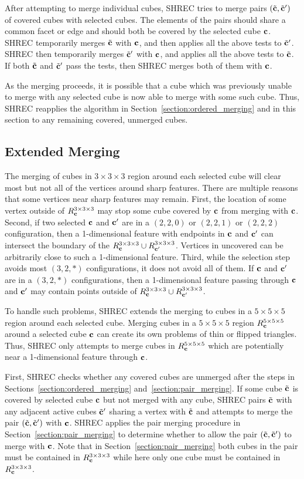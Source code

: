 After attempting to merge individual cubes,
SHREC tries to merge pairs $({\tilde{\mathbf{c}}},{\tilde{\mathbf{c}}}')$ of covered cubes with selected cubes.
The elements of the pairs should share a common facet or edge
and should both be covered by the selected cube $\mathbf{c}$.
SHREC temporarily merges ${\tilde{\mathbf{c}}}$ with $\mathbf{c}$,
and then applies all the above tests to ${\tilde{\mathbf{c}}}'$.
SHREC then temporarily merges ${\tilde{\mathbf{c}}}'$ with $\mathbf{c}$,
and applies all the above tests to ${\tilde{\mathbf{c}}}$.
If both ${\tilde{\mathbf{c}}}$ and ${\tilde{\mathbf{c}}}'$ pass the tests,
then SHREC merges both of them with $\mathbf{c}$.

As the merging proceeds,
it is possible that a cube which was previously unable 
to merge with any selected cube
is now able to merge with some such cube.
Thus, SHREC reapplies the algorithm in Section~\ref{section:ordered_merging}
and in this section to any remaining covered, unmerged cubes.


\subsection{Extended Merging}
\label{section:extended_merging}

The merging of cubes in $3 \times 3 \times 3$ region
around each selected cube will clear most but not all of the vertices 
around sharp features.
There are multiple reasons that some vertices 
near sharp features may remain.
First, the location of some vertex outside of $R^{3 \times 3 \times 3}_{\mathbf{c}}$
may stop some cube covered by $\mathbf{c}$ from merging with $\mathbf{c}$.
Second, if two selected $\mathbf{c}$ and $\mathbf{c}'$ are 
in a $(2,2,0)$ or $(2,2,1)$ or $(2,2,2)$ configuration, 
then a 1-dimensional feature with endpoints in $\mathbf{c}$ and $\mathbf{c}'$ can intersect
the boundary of the $R^{3 \times 3 \times 3}_{\mathbf{c}} \cup R^{3 \times 3 \times 3}_{\mathbf{c}'}$.
Vertices in uncovered can be arbitrarily close to such a 1-dimensional feature.
Third, while the selection step avoids most $(3,2,*)$ configurations,
it does not avoid all of them.
If $\mathbf{c}$ and $\mathbf{c}'$ are in a $(3,2,*)$ configurations,
then a 1-dimensional feature passing through $\mathbf{c}$ and $\mathbf{c}'$ 
may contain points outside of $R^{3 \times 3 \times 3}_{\mathbf{c}} \cup R^{3 \times 3 \times 3}_{\mathbf{c}'}$.

To handle such problems, SHREC extends the merging to cubes
in a $5 \times 5 \times 5$ region around each selected cube.
Merging cubes in a $5 \times 5 \times 5$ region $R^{5 \times 5 \times 5}_{\mathbf{c}}$
around a selected cube $\mathbf{c}$ can create its own problems 
of thin or flipped triangles.
Thus, SHREC only attempts to merge cubes in $R^{5 \times 5 \times 5}_{\mathbf{c}}$
which are potentially near a 1-dimensional feature through $\mathbf{c}$.

First, SHREC checks whether any covered cubes are unmerged
after the steps in Sections~\ref{section:ordered_merging}
and~\ref{section:pair_merging}.
If some cube ${\tilde{\mathbf{c}}}$ is covered by selected cube $\mathbf{c}$
but not merged with any cube,
SHREC pairs ${\tilde{\mathbf{c}}}$ with any adjacent active cubes ${\tilde{\mathbf{c}}}'$
sharing a vertex with ${\tilde{\mathbf{c}}}$
and attempts to merge the pair $({\tilde{\mathbf{c}}},{\tilde{\mathbf{c}}}')$ with $\mathbf{c}$.
SHREC applies the pair merging procedure
in Section~\ref{section:pair_merging} to determine whether
to allow the pair $({\tilde{\mathbf{c}}},{\tilde{\mathbf{c}}}')$ to merge with $\mathbf{c}$.
Note that in Section~\ref{section:pair_merging} both cubes in the pair
must be contained in $R^{3 \times 3 \times 3}_{\mathbf{c}}$ while here only one cube
must be contained in $R^{3 \times 3 \times 3}_{\mathbf{c}}$.

